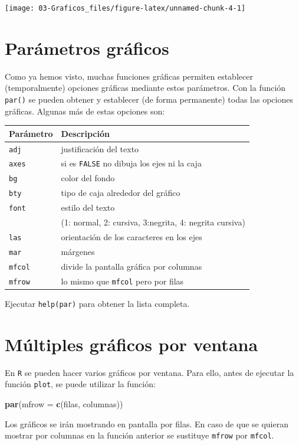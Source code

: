 \documentclass[]{book}
\newenvironment{Shaded}{\begin{snugshade}}{\end{snugshade}}
\newcommand{\KeywordTok}[1]{\textcolor[rgb]{0.13,0.29,0.53}{\textbf{#1}}}
\newcommand{\DataTypeTok}[1]{\textcolor[rgb]{0.13,0.29,0.53}{#1}}
\newcommand{\NormalTok}[1]{#1}
\begin{document}
\begin{center}\texttt{[image: 03-Graficos\_files/figure-latex/unnamed-chunk-4-1]} \end{center}

\section{Parámetros gráficos}\label{parametros-graficos}

Como ya hemos visto, muchas funciones gráficas permiten establecer
(temporalmente) opciones gráficas mediante estos parámetros. Con la
función \texttt{par()} se pueden obtener y establecer (de forma
permanente) todas las opciones gráficas. Algunas más de estas opciones
son:

\begin{longtable}[]{@{}ll@{}}
\toprule
Parámetro & Descripción\tabularnewline
\midrule
\endhead
\texttt{adj} & justificación del texto\tabularnewline
\texttt{axes} & si es \texttt{FALSE} no dibuja los ejes ni la
caja\tabularnewline
\texttt{bg} & color del fondo\tabularnewline
\texttt{bty} & tipo de caja alrededor del gráfico\tabularnewline
\texttt{font} & estilo del texto\tabularnewline
\ & (1: normal, 2: cursiva, 3:negrita, 4: negrita
cursiva)\tabularnewline
\texttt{las} & orientación de los caracteres en los ejes\tabularnewline
\texttt{mar} & márgenes\tabularnewline
\texttt{mfcol} & divide la pantalla gráfica por columnas\tabularnewline
\texttt{mfrow} & lo mismo que \texttt{mfcol} pero por
filas\tabularnewline
\bottomrule
\end{longtable}

Ejecutar \texttt{help(par)} para obtener la lista completa.

\section{Múltiples gráficos por
ventana}\label{multiples-graficos-por-ventana}

En \texttt{R} se pueden hacer varios gráficos por ventana. Para ello,
antes de ejecutar la función \texttt{plot}, se puede utilizar la
función:

\begin{Shaded}
\begin{Highlighting}[]
\KeywordTok{par}\NormalTok{(}\DataTypeTok{mfrow =} \KeywordTok{c}\NormalTok{(filas, columnas))}
\end{Highlighting}
\end{Shaded}

Los gráficos se irán mostrando en pantalla por filas. En caso de que se
quieran mostrar por columnas en la función anterior se sustituye
\texttt{mfrow} por \texttt{mfcol}.
\end{document}
